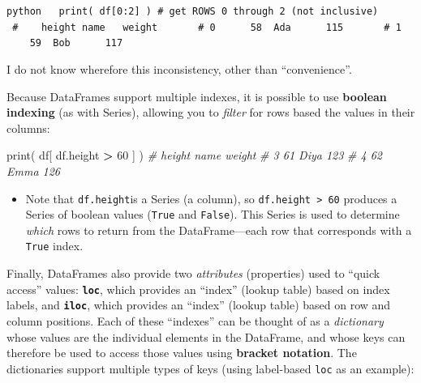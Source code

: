 \documentclass[]{book}
\newenvironment{Shaded}{\begin{snugshade}}{\end{snugshade}}
\newcommand{\DecValTok}[1]{\textcolor[rgb]{0.00,0.00,0.81}{#1}}
\newcommand{\CommentTok}[1]{\textcolor[rgb]{0.56,0.35,0.01}{\textit{#1}}}
\newcommand{\OperatorTok}[1]{\textcolor[rgb]{0.81,0.36,0.00}{\textbf{#1}}}
\newcommand{\BuiltInTok}[1]{#1}
\newcommand{\NormalTok}[1]{#1}
\providecommand{\tightlist}{%
  \setlength{\itemsep}{0pt}\setlength{\parskip}{0pt}}
\begin{document}
\texttt{python\ \ \ print(\ df{[}0:2{]}\ )\ \#\ get\ ROWS\ 0\ through\ 2\ (not\ inclusive)\ \ \ \ \ \ \ \#\ \ \ \ height\ name\ \ \ weight\ \ \ \ \ \ \ \#\ 0\ \ \ \ \ \ 58\ \ Ada\ \ \ \ \ \ 115\ \ \ \ \ \ \ \#\ 1\ \ \ \ \ \ 59\ \ Bob\ \ \ \ \ \ 117}

I do not know wherefore this inconsistency, other than ``convenience''.

Because DataFrames support multiple indexes, it is possible to use
\textbf{boolean indexing} (as with Series), allowing you to
\emph{filter} for rows based the values in their columns:

\begin{Shaded}
\begin{Highlighting}[]
\BuiltInTok{print}\NormalTok{( df[ df.height }\OperatorTok{>} \DecValTok{60}\NormalTok{ ] )}
    \CommentTok{#    height  name  weight}
    \CommentTok{# 3      61  Diya     123}
    \CommentTok{# 4      62  Emma     126}
\end{Highlighting}
\end{Shaded}

\begin{itemize}
\tightlist
\item
  Note that \texttt{df.height}is a Series (a column), so
  \texttt{df.height\ \textgreater{}\ 60} produces a Series of boolean
  values (\texttt{True} and \texttt{False}). This Series is used to
  determine \emph{which} rows to return from the DataFrame---each row
  that corresponds with a \texttt{True} index.
\end{itemize}

Finally, DataFrames also provide two \emph{attributes} (properties) used
to ``quick access'' values: \textbf{\texttt{loc}}, which provides an
``index'' (lookup table) based on index labels, and
\textbf{\texttt{iloc}}, which provides an ``index'' (lookup table) based
on row and column positions. Each of these ``indexes'' can be thought of
as a \emph{dictionary} whose values are the individual elements in the
DataFrame, and whose keys can therefore be used to access those values
using \textbf{bracket notation}. The dictionaries support multiple types
of keys (using label-based \texttt{loc} as an example):
\end{document}
